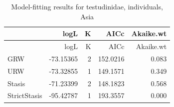 \documentclass[]{article}
\begin{document}
\begin{longtable}[]{@{}lrrrr@{}}
\caption{Model-fitting results for testudinidae, individuals,
Asia}\tabularnewline
\toprule
& logL & K & AICc & Akaike.wt\tabularnewline
\midrule
\endfirsthead
\toprule
& logL & K & AICc & Akaike.wt\tabularnewline
\midrule
\endhead
GRW & -73.15365 & 2 & 152.0216 & 0.083\tabularnewline
URW & -73.32855 & 1 & 149.1571 & 0.349\tabularnewline
Stasis & -71.23399 & 2 & 148.1823 & 0.568\tabularnewline
StrictStasis & -95.42787 & 1 & 193.3557 & 0.000\tabularnewline
\bottomrule
\end{longtable}
\end{document}
